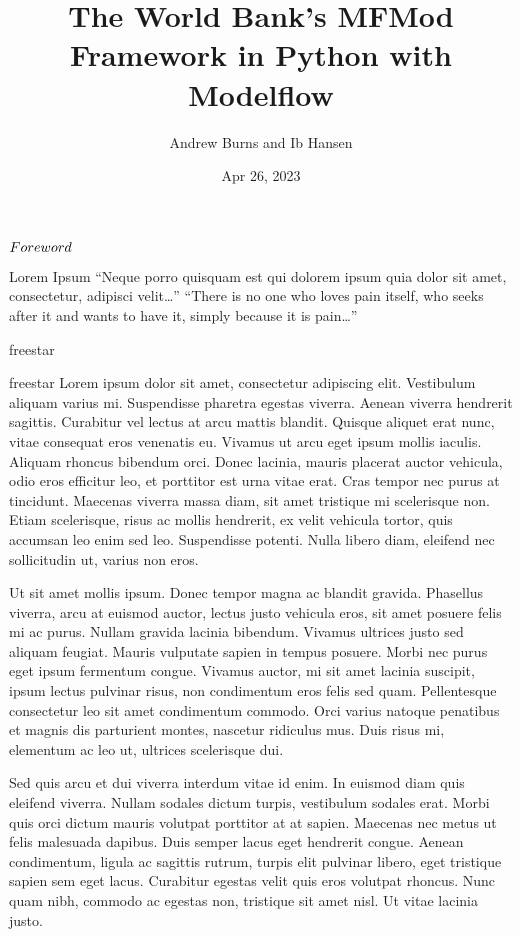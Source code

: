 \documentclass[letterpaper,10pt,english]{jupyterBook}
\title{The World Bank's MFMod Framework in Python with Modelflow}
\date{Apr 26, 2023}
\author{Andrew Burns and Ib Hansen}
\begin{document}
\pagestyle{empty}
\sphinxmaketitle
\pagestyle{plain}
\sphinxtableofcontents
\pagestyle{normal}
\label{\detokenize{content/introduction::doc}}


\sphinxAtStartPar
\(\Large{Foreword}\)

\sphinxAtStartPar
Lorem Ipsum
“Neque porro quisquam est qui dolorem ipsum quia dolor sit amet, consectetur, adipisci velit…”
“There is no one who loves pain itself, who seeks after it and wants to have it, simply because it is pain…”

\sphinxAtStartPar
freestar

\sphinxAtStartPar
freestar
Lorem ipsum dolor sit amet, consectetur adipiscing elit. Vestibulum aliquam varius mi. Suspendisse pharetra egestas viverra. Aenean viverra hendrerit sagittis. Curabitur vel lectus at arcu mattis blandit. Quisque aliquet erat nunc, vitae consequat eros venenatis eu. Vivamus ut arcu eget ipsum mollis iaculis. Aliquam rhoncus bibendum orci. Donec lacinia, mauris placerat auctor vehicula, odio eros efficitur leo, et porttitor est urna vitae erat. Cras tempor nec purus at tincidunt. Maecenas viverra massa diam, sit amet tristique mi scelerisque non. Etiam scelerisque, risus ac mollis hendrerit, ex velit vehicula tortor, quis accumsan leo enim sed leo. Suspendisse potenti. Nulla libero diam, eleifend nec sollicitudin ut, varius non eros.

\sphinxAtStartPar
Ut sit amet mollis ipsum. Donec tempor magna ac blandit gravida. Phasellus viverra, arcu at euismod auctor, lectus justo vehicula eros, sit amet posuere felis mi ac purus. Nullam gravida lacinia bibendum. Vivamus ultrices justo sed aliquam feugiat. Mauris vulputate sapien in tempus posuere. Morbi nec purus eget ipsum fermentum congue. Vivamus auctor, mi sit amet lacinia suscipit, ipsum lectus pulvinar risus, non condimentum eros felis sed quam. Pellentesque consectetur leo sit amet condimentum commodo. Orci varius natoque penatibus et magnis dis parturient montes, nascetur ridiculus mus. Duis risus mi, elementum ac leo ut, ultrices scelerisque dui.

\sphinxAtStartPar
Sed quis arcu et dui viverra interdum vitae id enim. In euismod diam quis eleifend viverra. Nullam sodales dictum turpis, vestibulum sodales erat. Morbi quis orci dictum mauris volutpat porttitor at at sapien. Maecenas nec metus ut felis malesuada dapibus. Duis semper lacus eget hendrerit congue. Aenean condimentum, ligula ac sagittis rutrum, turpis elit pulvinar libero, eget tristique sapien sem eget lacus. Curabitur egestas velit quis eros volutpat rhoncus. Nunc quam nibh, commodo ac egestas non, tristique sit amet nisl. Ut vitae lacinia justo.
\end{document}
